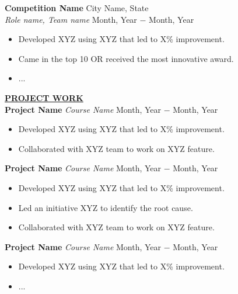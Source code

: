 \documentclass{article}
\begin{document}
\noindent \textbf{Competition Name} \hfill City Name, State \\
\textit{Role name, Team name} \hfill Month, Year $-$ Month, Year
\begin{itemize}[noitemsep,nolistsep,leftmargin=*]
\item {Developed XYZ using XYZ that led to X\% improvement.}
\item{Came in the top 10 OR received the most innovative award.}
\item {... \\}
\end{itemize}

%
%
\noindent \textbf{\underline{PROJECT WORK}} \\
\noindent \textbf{Project Name} \textit{Course Name} \hfill  Month, Year $-$ Month, Year
\begin{itemize}[noitemsep,nolistsep,leftmargin=*]
\item {Developed XYZ using XYZ that led to X\% improvement.}
\item {Collaborated with XYZ team to work on XYZ feature. \\}
\end{itemize}

\noindent \textbf{Project Name} \textit{Course Name} \hfill  Month, Year $-$ Month, Year
\begin{itemize}[noitemsep,nolistsep,leftmargin=*]
\item {Developed XYZ using XYZ that led to X\% improvement.}
\item {Led an initiative XYZ to identify the root cause.}
\item {Collaborated with XYZ team to work on XYZ feature. \\}
\end{itemize}

\noindent \textbf{Project Name} \textit{Course Name} \hfill  Month, Year $-$ Month, Year
\begin{itemize}[noitemsep,nolistsep,leftmargin=*]
\item {Developed XYZ using XYZ that led to X\% improvement.}
\item {... \\}
\end{itemize}
\end{document}

